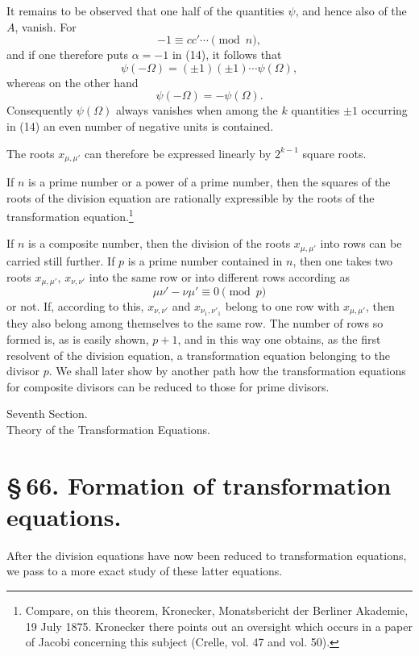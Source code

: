 \documentclass[11pt]{article}
\begin{document}
It remains to be observed that one half of the quantities $\psi$, and hence also of the
$A$, vanish. For
\[
 -1\equiv cc'\cdots\pmod n,
\]
and if one therefore puts $\alpha=-1$ in (14), it follows that
\[
 \psi(-\Omega)=(\pm1)(\pm1)\cdots\psi(\Omega),
\]
whereas on the other hand
\[
 \psi(-\Omega)=-\psi(\Omega).
\]
Consequently $\psi(\Omega)$ always vanishes when among the $k$ quantities $\pm1$ occurring
in (14) an even number of negative units is contained.

The roots $x_{\mu,\mu'}$ can therefore be expressed linearly by $2^{k-1}$ square roots.

If $n$ is a prime number or a power of a prime number, then the squares of the roots of the
division equation are rationally expressible by the roots of the transformation equation.\footnote{Compare, on this theorem, Kronecker, Monatsbericht der Berliner Akademie, 19 July 1875. Kronecker there points out an oversight which occurs in a paper of Jacobi concerning this subject (Crelle, vol. 47 and vol. 50).}

If $n$ is a composite number, then the division of the roots $x_{\mu,\mu'}$ into rows can be
carried still further. If $p$ is a prime number contained in $n$, then one takes two roots
$x_{\mu,\mu'}$, $x_{\nu,\nu'}$ into the same row or into different rows according as
\[
 \mu\nu'-\nu\mu'\equiv0\pmod p
\]
or not. If, according to this, $x_{\nu,\nu'}$ and $x_{\nu_1,\nu'_1}$ belong to one row with
$x_{\mu,\mu'}$, then they also belong among themselves to the same row. The number of
rows so formed is, as is easily shown, $p+1$, and in this way one obtains, as the first
resolvent of the division equation, a transformation equation belonging to the divisor $p$.
We shall later show by another path how the transformation equations for composite
divisors can be reduced to those for prime divisors.


\begin{center}
{\large Seventh Section.}\\[0.7em]
{\Large Theory of the Transformation Equations.}
\end{center}

\section*{\S\,66. Formation of transformation equations.}

After the division equations have now been reduced to transformation equations, we pass to a more exact study of these latter equations.
\end{document}
